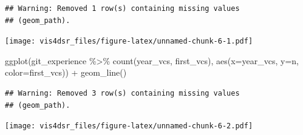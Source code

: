 \documentclass[
]{krantz}
\makeatletter
\newenvironment{Shaded}{\begin{snugshade}}{\end{snugshade}}
\newcommand{\AttributeTok}[1]{\textcolor[rgb]{0.61,0.61,0.61}{#1}}
\newcommand{\FunctionTok}[1]{\textcolor[rgb]{0,0,0}{#1}}
\newcommand{\NormalTok}[1]{#1}
\newcommand{\SpecialCharTok}[1]{\textcolor[rgb]{0,0,0}{#1}}
\newenvironment{kframe}{%
\medskip{}
\setlength{\fboxsep}{.8em}
 \def\at@end@of@kframe{}%
 \ifinner\ifhmode%
  \def\at@end@of@kframe{\end{minipage}}%
  \begin{minipage}{\columnwidth}%
 \fi\fi%
 \def\FrameCommand##1{\hskip\@totalleftmargin \hskip-\fboxsep
 \colorbox{shadecolor}{##1}\hskip-\fboxsep
     \hskip-\linewidth \hskip-\@totalleftmargin \hskip\columnwidth}%
 \MakeFramed {\advance\hsize-\width
   \@totalleftmargin\z@ \linewidth\hsize
   \@setminipage}}%
 {\par\unskip\endMakeFramed%
 \at@end@of@kframe}
\renewenvironment{Shaded}{\begin{kframe}}{\end{kframe}}
\makeatother
\begin{document}
\begin{verbatim}
## Warning: Removed 1 row(s) containing missing values
## (geom_path).
\end{verbatim}

\texttt{[image: vis4dsr\_files/figure-latex/unnamed-chunk-6-1.pdf]}

\begin{Shaded}
\begin{Highlighting}[]
\FunctionTok{ggplot}\NormalTok{(git\_experience }\SpecialCharTok{\%\textgreater{}\%} \FunctionTok{count}\NormalTok{(year\_vcs, first\_vcs), }\FunctionTok{aes}\NormalTok{(}\AttributeTok{x=}\NormalTok{year\_vcs, }\AttributeTok{y=}\NormalTok{n, }\AttributeTok{color=}\NormalTok{first\_vcs)) }\SpecialCharTok{+}
  \FunctionTok{geom\_line}\NormalTok{()}
\end{Highlighting}
\end{Shaded}

\begin{verbatim}
## Warning: Removed 3 row(s) containing missing values
## (geom_path).
\end{verbatim}

\texttt{[image: vis4dsr\_files/figure-latex/unnamed-chunk-6-2.pdf]}
\end{document}
